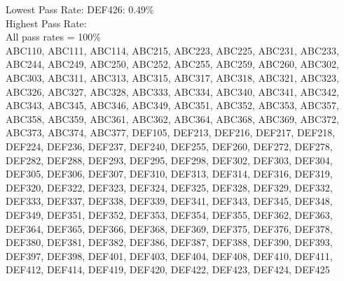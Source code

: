 Lowest Pass Rate:
DEF426: 0.49\%\\

Highest Pass Rate:\\
All pass rates = 100\%\\
ABC110, ABC111, ABC114, ABC215, ABC223, ABC225, ABC231, ABC233, ABC244, ABC249, ABC250, ABC252, ABC255, ABC259, ABC260, ABC302, ABC303, ABC311, ABC313, ABC315, ABC317, ABC318, ABC321, ABC323, ABC326, ABC327, ABC328, ABC333, ABC334, ABC340, ABC341, ABC342, ABC343, ABC345, ABC346, ABC349, ABC351, ABC352, ABC353, ABC357, ABC358, ABC359, ABC361, ABC362, ABC364, ABC368, ABC369, ABC372, ABC373, ABC374, ABC377, DEF105, DEF213, DEF216, DEF217, DEF218, DEF224, DEF236, DEF237, DEF240, DEF255, DEF260, DEF272, DEF278, DEF282, DEF288, DEF293, DEF295, DEF298, DEF302, DEF303, DEF304, DEF305, DEF306, DEF307, DEF310, DEF313, DEF314, DEF316, DEF319, DEF320, DEF322, DEF323, DEF324, DEF325, DEF328, DEF329, DEF332, DEF333, DEF337, DEF338, DEF339, DEF341, DEF343, DEF345, DEF348, DEF349, DEF351, DEF352, DEF353, DEF354, DEF355, DEF362, DEF363, DEF364, DEF365, DEF366, DEF368, DEF369, DEF375, DEF376, DEF378, DEF380, DEF381, DEF382, DEF386, DEF387, DEF388, DEF390, DEF393, DEF397, DEF398, DEF401, DEF403, DEF404, DEF408, DEF410, DEF411, DEF412, DEF414, DEF419, DEF420, DEF422, DEF423, DEF424, DEF425